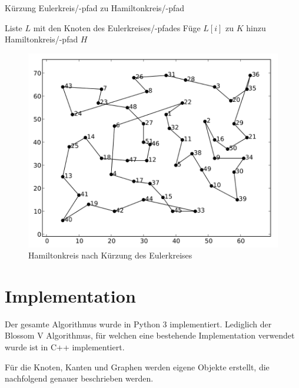 \documentclass[11pt,a4paper]{article}
\begin{document}
\begin{algorithm}[H]
    \renewcommand{\algorithmicrequire}{\textbf{Eingabe:}}
    \renewcommand{\algorithmicensure}{\textbf{Ausgabe:}}
    \caption{Kürzung Eulerkreis/-pfad zu Hamiltonkreis/-pfad}

    \begin{algorithmic}[1]
    \REQUIRE Liste $L$ mit den Knoten des Eulerkreises/-pfades 
            \STATE Füge $L[i]$ zu $K$ hinzu
        \ENDIF
    \ENDFOR
    \ENSURE Hamiltonkreis/-pfad $H$
    \end{algorithmic}
\end{algorithm}

\begin{figure}[H]
        \centering
        \includegraphics[width=14cm]{gfx/eil51_tour}
        \caption{Hamiltonkreis nach Kürzung des Eulerkreises}
        \label{img:eil51_tour}
\end{figure}

\newpage
\section{Implementation}
Der gesamte Algorithmus wurde in Python 3 implementiert. Lediglich der Blossom V Algorithmus, für welchen eine bestehende Implementation verwendet wurde ist in C++ implementiert.

Für die Knoten, Kanten und Graphen werden eigene Objekte erstellt, die nachfolgend genauer beschrieben werden. 

\end{document}
